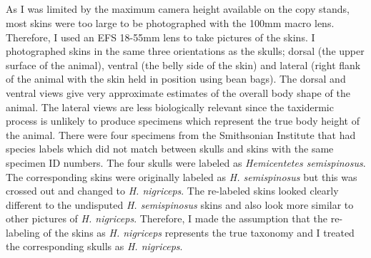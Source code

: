 	\subsection{}
	As I was limited by the maximum camera height available on the copy stands, most skins were too large to be photographed with the 100mm macro lens. Therefore, I used an EFS 18-55mm lens to take pictures of the skins. I photographed skins in the same three orientations as the skulls; dorsal (the upper surface of the animal), ventral (the belly side of the skin) and lateral (right flank of the animal with the skin held in position using bean bags). The dorsal and ventral views give very approximate estimates of the overall body shape of the animal. The lateral views are less biologically relevant since the taxidermic process is unlikely to produce specimens which represent the true body height of the animal. 
	There were four specimens from the Smithsonian Institute that had species labels which did not match between skulls and skins with the same specimen ID numbers. The four skulls were labeled as \textit{Hemicentetes semispinosus}. The corresponding skins were originally labeled as \textit{H. semispinosus} but this was crossed out and changed to \textit{H. nigriceps}. The re-labeled skins looked clearly different to the undisputed \textit{H. semispinosus} skins and also look more similar to other pictures of \textit{H. nigriceps}. Therefore, I made the assumption that the re-labeling of the skins as \textit{H. nigriceps} represents the true taxonomy and I treated the corresponding skulls as \textit{H. nigriceps}.
	


	

	
